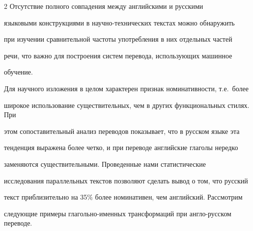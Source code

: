 \begin{multicols}{2}
Отсутствие полного совпадения между английскими и русскими


языковыми конструкциями в научно-технических текстах можно обнаружить


при изучении сравнительной частоты употребления в них отдельных частей


речи, что важно для построения систем перевода, использующих машинное


обучение.





Для научного изложения в целом характерен признак номинативности, т.е.\ более 


широкое использование существительных, чем в других функциональных стилях. При 


этом сопоставительный анализ переводов показывает, что в русском языке эта 


тенденция выражена более четко, и при пе\-ре\-воде английские глаголы нередко 


заменяются суще\-ст\-ви\-тель\-ны\-ми. Проведенные нами статистические 


исследования параллельных текстов позволяют сделать вывод о том, что русский 


текст приблизительно на 35\% более номинативен, чем английский. Рассмотрим 


следующие примеры глагольно-именных трансформаций при англо-русском переводе.


\end{multicols}
